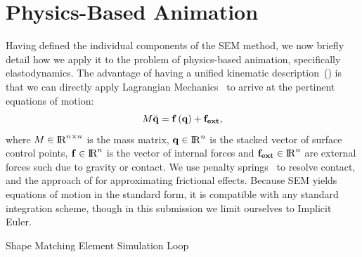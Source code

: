 \section{Physics-Based Animation}
Having defined the individual components of the SEM method, we now briefly detail how we apply it to the problem of 
physics-based animation, specifically elastodynamics. 
The advantage of having a unified kinematic description~() is that we can directly apply Lagrangian Mechanics~ to arrive at 
the pertinent equations of motion:
\begin{equation*}
    M\ddot{\mathbf{q}} = \mathbf{f}\left(\mathbf{q}\right) + \mathbf{f_{ext}},
\end{equation*} where $M\in{\rm I\!R}^{n\times n}$ is the mass matrix, $\mathbf{q}\in{\rm I\!R}^{n}$ is the stacked vector of surface control points, $\mathbf{f}\in{\rm I\!R}^{n}$ is the 
vector of internal forces and $\mathbf{f_{ext}}\in{\rm I\!R}^{n}$ are external forces such due to gravity or contact. 
We use penalty springs~\cite{10.1145/1964921.1964932} to resolve contact, and the approach of \citet{10.1145/566654.566623} for approximating frictional effects. 
Because SEM yields equations of motion in the standard form, it is compatible with any standard integration scheme, though in this submission we limit ourselves to
Implicit Euler.

\begin{algorithm}[h]
	\begin{algorithmic}[1]
				
  			\EndFor
     	\EndWhile
	\EndProcedure
\end{algorithmic}
\caption{Shape Matching Element Simulation Loop}
\label{alg:sem_simulation}
\end{algorithm}

